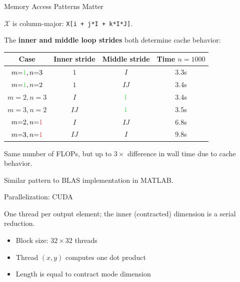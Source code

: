 \documentclass{beamer}
\begin{document}
\begin{frame}{Memory Access Patterns Matter}

$\mathcal{X}$ is column-major: \texttt{X[i + j*I + k*I*J]}.

The \textbf{inner and middle loop strides} both determine cache behavior:

\medskip

\begin{center}
\begin{tabular}{cccc}
\hline
\textbf{Case} & \textbf{Inner stride} & \textbf{Middle stride} & \textbf{Time $n=1000$} \\
\hline
$m{=}\textcolor{goodgreen}{1}, n{=}3$                        & $1$  & $I$  & 3.3s \\
$m{=}\textcolor{goodgreen}{1}, n{=}{2}$    & $1$  & $IJ$ & 3.4s \\
$m{=}2, n{=}{3}$                        & $I$  & $\textcolor{goodgreen}{1}$  & 3.4s \\
$m{=}{3}, n{=}{2}$    & $IJ$ & $\textcolor{goodgreen}{1}$  & 3.5s \\
$m{=}2, n{=}\textcolor{badred}{1}$                           & $I$  & $IJ$ & 6.8s \\
$m{=}{3}, n{=}\textcolor{badred}{1}$                           & $IJ$ & $I$  & 9.8s \\
\hline
\end{tabular}
\end{center}

\medskip

Same number of FLOPs, but up to $3\times$ difference in wall time due to cache behavior.

Similar pattern to BLAS implementation in MATLAB.

\end{frame}

\begin{frame}{Parallelization: CUDA}

One thread per output element; the inner (contracted) dimension is a serial reduction.

\medskip

\begin{center}
\resizebox{0.95\linewidth}{!}{}
\end{center}

\medskip

\begin{itemize}
  \item Block size: $32 \times 32$ threads
  \item Thread $(x,y)$ computes one dot product
  \item Length is equal to contract mode dimension
\end{itemize}

\end{frame}
\end{document}
